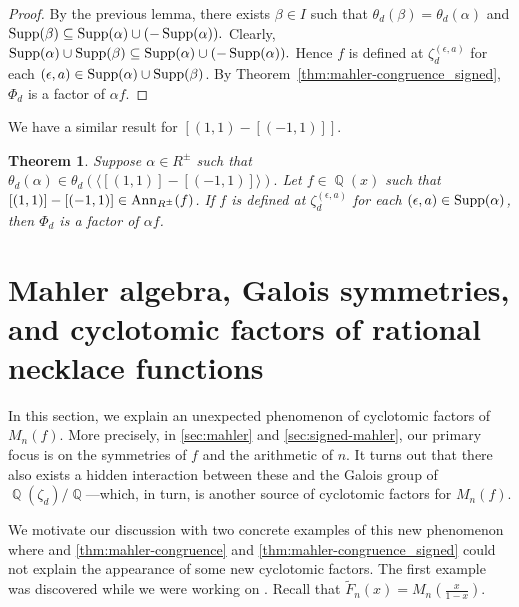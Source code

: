 \documentclass[12t,a4paper]{amsart}
\newtheorem{thm}{Theorem}[section]
\theoremstyle{definition}
\DeclareMathOperator{\Q}{\mathbb{Q}}
\DeclareMathOperator{\supp}{{\rm Supp}}
\newcommand{\Ann}{{\rm Ann}}
\numberwithin{equation}{section}
\begin{document}
{\begin{proof}
    By the previous lemma, there exists $\beta\in I$ such that $\theta_d(\beta)=\theta_d(\alpha)$ and
    \(
    \supp(\beta)\subseteq \supp(\alpha)\cup(-\supp(\alpha)).
    \)
    Clearly, \( \supp(\alpha)\cup\supp(\beta) \subseteq \supp(\alpha)\cup(-\supp(\alpha)).\) Hence $f$ is defined at $\zeta_d^{(\epsilon,a)}$ for each $(\epsilon,a)\in \supp(\alpha)\cup \supp(\beta)$. 
    By Theorem~\ref{thm:mahler-congruence_signed}, $\Phi_d$ is a factor of $\alpha f$. 
\end{proof}
We have a similar result for $[(1,1)-[(-1,1)]]$.

    \begin{thm} \label{thm:mahler-congruence_signed_02}
Suppose $\alpha \in R^\pm$ such that $\theta_d(\alpha) \in \theta_d(\langle [(1,1)]-[(-1,1)] \rangle).$ Let $f \in \Q(x)$ such that $[(1,1)]-[(-1,1)]\in \Ann_{R^\pm}(f)$. If $f$ is defined at $\zeta_d^{(\epsilon,a)}$ for each $(\epsilon,a) \in \supp(\alpha)$, then $\Phi_d$ is a factor of $\alpha f$. 
\end{thm}


\section{Mahler algebra, Galois symmetries, and cyclotomic factors of rational necklace functions} \label{sec:galois}
In this section, we explain an unexpected phenomenon of cyclotomic factors of $M_n(f)$. More precisely, in \cref{sec:mahler} and \cref{sec:signed-mahler}, our primary focus is on the symmetries of $f$ and the arithmetic of $n$. It turns out that there also exists a hidden interaction between these and the Galois group of $\Q(\zeta_d)/\Q$—which, in turn, is another source of cyclotomic factors for $M_n(f)$.

We motivate our discussion with two concrete examples of this new phenomenon where \cite[Theorem 2.19]{chidambaram2023fekete} and \cref{thm:mahler-congruence} and \cref{thm:mahler-congruence_signed} could not explain the appearance of some new cyclotomic factors. The first example was discovered while we were working on \cite{chidambaram2023fekete}. Recall that $\tilde{F}_n(x) = M_n(\frac{x}{1-x}).$  

}
\end{document}
